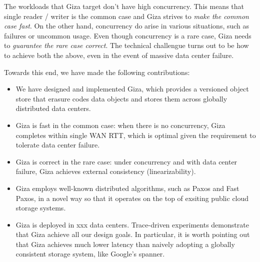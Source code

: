 The workloads that Giza target don't have high concurrency. This means that single reader / writer is the common case and Giza strives to {\em make the common case fast}. On the other hand, concurrency do arise in various situations, such as failures or uncommon usage. Even though concurrency is a rare case, Giza needs to {\em guarantee the rare case correct}. The technical challengue turns out to be how to achieve both the above, even in the event of massive data center failure.

Towards this end, we have made the following contributions:
\begin{itemize}
    \item We have designed and implemented Giza, which provides a versioned object store that erasure codes data objects and stores them across globally distributed data centers.
    \item Giza is fast in the common case: when there is no concurrency, Giza completes within single WAN RTT, which is optimal given the requirement to tolerate data center failure.
    \item Giza is correct in the rare case: under concurrency and with data center failure, Giza achieves external consistency (linearizability).
    \item Giza employs well-known distributed algorithms, such as Paxos and Fast Paxos, in a novel way so that it operates on the top of exsiting public cloud storage systems.
    \item Giza is deployed in xxx data centers. Trace-driven experiments demonstrate that Giza achieve all our design goals. In particular, it is worth pointing out that Giza achieves much lower latency than naively adopting a globally consistent storage system, like Google's spanner.
\end{itemize}

